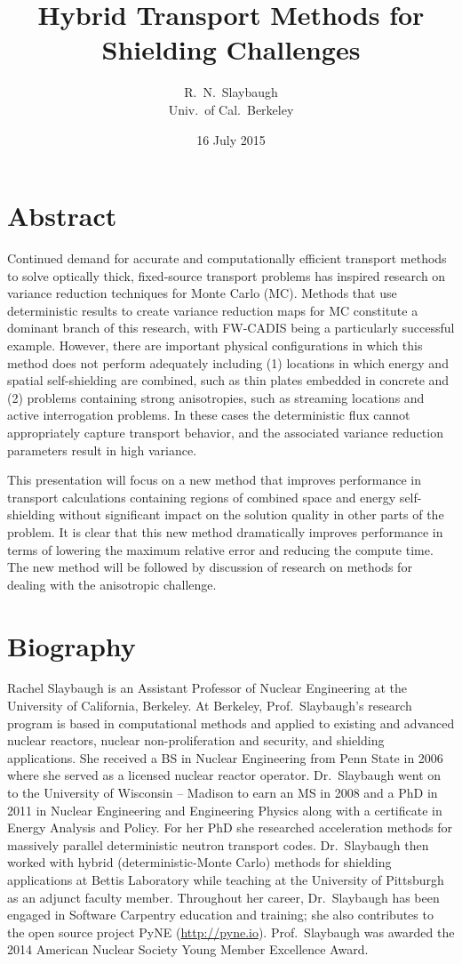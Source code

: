 \documentclass[12pt]{article}
\title{Hybrid Transport Methods for Shielding Challenges}
\author{R.\ N.\ Slaybaugh \\ Univ.\ of Cal.\ Berkeley}
\date{16 July 2015}
\begin{document}
\maketitle

\section*{Abstract}

Continued demand for accurate and computationally efficient transport methods to solve optically thick, fixed-source transport problems has inspired research on variance reduction techniques for Monte Carlo (MC). Methods that use deterministic results to create variance reduction maps for MC constitute a dominant branch of this research, with FW-CADIS being a particularly successful example. However, there are important physical configurations in which this method does not perform adequately including (1) locations in which energy and spatial self-shielding are combined, such as thin plates embedded in concrete and (2) problems containing strong anisotropies, such as streaming locations and active interrogation problems. In these cases the deterministic flux cannot appropriately capture transport behavior, and the associated variance reduction parameters result in high variance. 

This presentation will focus on a new method that improves performance in transport calculations containing regions of combined space and energy self-shielding without significant impact on the solution quality in other parts of the problem. It is clear that this new method dramatically improves performance in terms of lowering the maximum relative error and reducing the compute time. The new method will be followed by discussion of research on methods for dealing with the anisotropic challenge.

\section*{Biography}
Rachel Slaybaugh is an Assistant Professor of Nuclear Engineering at the University of California, Berkeley. At Berkeley, Prof.\ Slaybaugh's research program is based in computational methods and applied to existing and advanced nuclear reactors, nuclear non-proliferation and security, and shielding applications. She received a BS in Nuclear Engineering from Penn State in 2006 where she served as a licensed nuclear reactor operator. Dr.\ Slaybaugh went on to the University of Wisconsin -- Madison to earn an MS in 2008 and a PhD in 2011 in Nuclear Engineering and Engineering Physics along with a certificate in Energy Analysis and Policy. For her PhD she researched acceleration methods for massively parallel deterministic neutron transport codes. Dr.\ Slaybaugh then worked with hybrid (deterministic-Monte Carlo) methods for shielding applications at Bettis Laboratory while teaching at the University of Pittsburgh as an adjunct faculty member. Throughout her career, Dr.\ Slaybaugh has been engaged in Software Carpentry education and training; she also contributes to the open source project PyNE (\href{http://pyne.io}{http://pyne.io}). Prof.\ Slaybaugh was awarded the 2014 American Nuclear Society Young Member Excellence Award.
\end{document}
